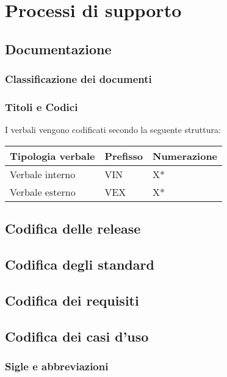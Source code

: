 \chapter{Processi di supporto}

\section{Documentazione}

\subsection{Classificazione dei documenti}

\subsection{Titoli e Codici}

I verbali vengono codificati secondo la seguente struttura:

\begin{center}
    \begin{tabularx}{\linewidth}{l | l | X}
        \textbf{Tipologia verbale} & \textbf{Prefisso} & \textbf{Numerazione}\\
        \hline
        Verbale interno & VIN & X* \\
        Verbale esterno & VEX & X* \\
    \end{tabularx}
\end{center}

\section{Codifica delle release}

\section{Codifica degli standard}

\section{Codifica dei requisiti}

\section{Codifica dei casi d'uso}

\subsection{Sigle e abbreviazioni}

